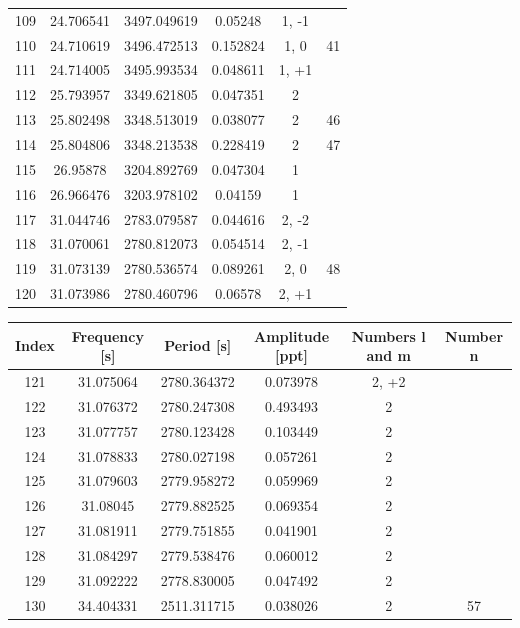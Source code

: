 \documentclass{aa}
\begin{document}
\begin{table}[]
\begin{tabular}{c|c|c|c|c|c}
109 &  24.706541 &  3497.049619 &   0.05248 &    1, -1  &      \\
110 &  24.710619 &  3496.472513 &  0.152824 &    1, 0  &     41 \\
111 &  24.714005 &  3495.993534 &  0.048611 &    1, +1  &      \\
112 &  25.793957 &  3349.621805 &  0.047351 &   2  &         \\
113 &  25.802498 &  3348.513019 &  0.038077 &   2  &     46 \\
114 &  25.804806 &  3348.213538 &  0.228419 &   2  &     47 \\
115 &   26.95878 &  3204.892769 &  0.047304 &    1  &         \\
116 &  26.966476 &  3203.978102 &   0.04159 &    1  &         \\
117 &  31.044746 &  2783.079587 &  0.044616 &    2, -2 &         \\
118 &  31.070061 &  2780.812073 &  0.054514 &    2, -1  &      \\
119 &  31.073139 &  2780.536574 &  0.089261 &    2, 0  &     48 \\
120 &  31.073986 &  2780.460796 &   0.06578 &    2, +1  &      \\
    \end{tabular}
\end{table}

\begin{table}[]
    \centering
    \begin{tabular}{c|c|c|c|c|c}
Index & Frequency [s] & Period [s] & Amplitude [ppt] & Numbers l and m & Number n \\ 
\hline 

121 &  31.075064 &  2780.364372 &  0.073978 &    2, +2  &      \\
122 &  31.076372 &  2780.247308 &  0.493493 &    2  &         \\
123 &  31.077757 &  2780.123428 &  0.103449 &    2  &         \\
124 &  31.078833 &  2780.027198 &  0.057261 &    2  &         \\
125 &  31.079603 &  2779.958272 &  0.059969 &    2  &         \\
126 &   31.08045 &  2779.882525 &  0.069354 &    2  &         \\
127 &  31.081911 &  2779.751855 &  0.041901 &    2  &         \\
128 &  31.084297 &  2779.538476 &  0.060012 &    2  &         \\
129 &  31.092222 &  2778.830005 &  0.047492 &    2  &         \\
130 &  34.404331 &  2511.311715 &  0.038026 &    2  &     57 \\
    \end{tabular}
    \label{tab:my_label}
\end{table}
\end{document}
